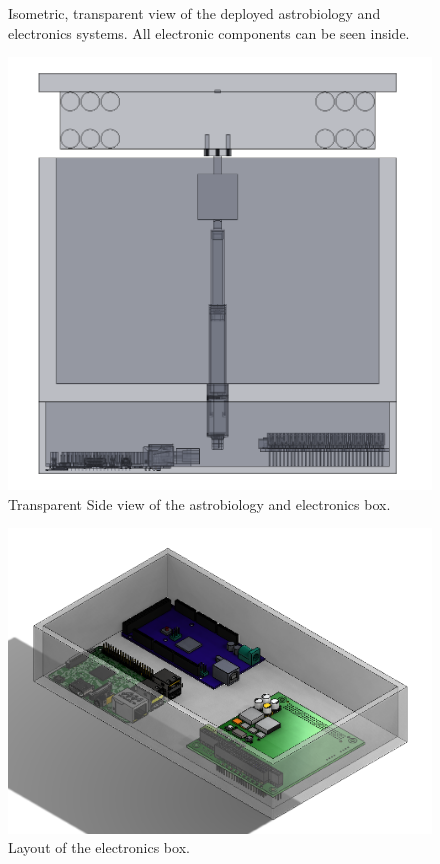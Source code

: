 \begin{centering}
\begin{figure}[H]
    \caption{Isometric, transparent view of the deployed astrobiology and electronics systems. All electronic components can be seen inside.}
    \label{fig:astrobio-electronics-image}
  \end{figure}
  \begin{figure}[H]
    \includegraphics[width=\textwidth]{Figures/astrobio-electronics-deployed-transparent-sideview.png}
    \caption{Transparent Side view of the astrobiology and electronics box.}
    \label{fig:astrobio-electronics-image-sideview}
  \end{figure}
  \begin{figure}[H]
    \includegraphics[width=\textwidth]{Figures/electronics-box.png}
    \caption{Layout of the electronics box.}
    \label{fig:electronics-box}
  \end{figure}  


\end{centering}

